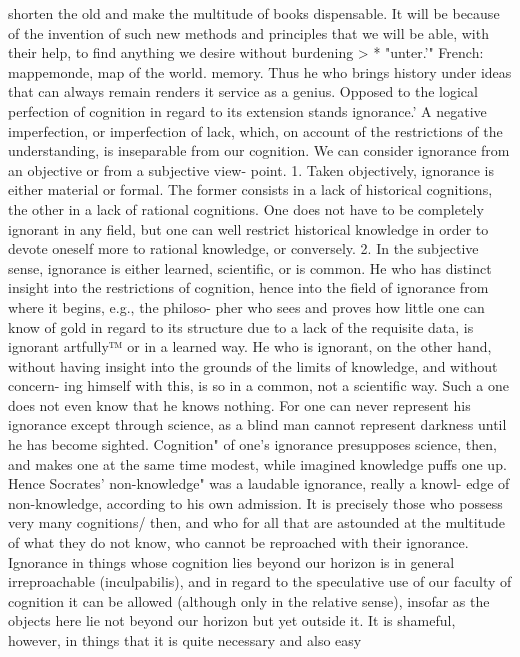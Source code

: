 shorten the old and make the multitude of books dispensable. It will be
because of the invention of such new methods and principles that we will
be able, with their help, to find anything we desire without burdening
>
*
"unter.'"
French: mappemonde, map of the world.
memory. Thus he who brings history under ideas that can always remain
renders it service as a genius.
Opposed to the logical perfection of cognition in regard to its extension
stands ignorance.' A negative imperfection, or imperfection of lack, which,
on account of the restrictions of the understanding, is inseparable from
our cognition.
We can consider ignorance from an objective or from a subjective view-
point.
1. Taken objectively, ignorance is either material or formal. The former
consists in a lack of historical cognitions, the other in a lack of rational
cognitions. One does not have to be completely ignorant in any field, but
one can well restrict historical knowledge in order to devote oneself more
to rational knowledge, or conversely.
2. In the subjective sense, ignorance is either learned, scientific, or is
common. He who has distinct insight into the restrictions of cognition,
hence into the field of ignorance from where it begins, e.g., the philoso-
pher who sees and proves how little one can know of gold in regard to its
structure due to a lack of the requisite data, is ignorant artfully™ or in a
learned way. He who is ignorant, on the other hand, without having
insight into the grounds of the limits of knowledge, and without concern-
ing himself with this, is so in a common, not a scientific way. Such a one
does not even know that he knows nothing. For one can never represent
his ignorance except through science, as a blind man cannot represent
darkness until he has become sighted.
Cognition" of one's ignorance presupposes science, then, and makes
one at the same time modest, while imagined knowledge puffs one up.
Hence Socrates' non-knowledge" was a laudable ignorance, really a knowl-
edge of non-knowledge, according to his own admission. It is precisely
those who possess very many cognitions/ then, and who for all that are
astounded at the multitude of what they do not know, who cannot be
reproached with their ignorance.
Ignorance in things whose cognition lies beyond our horizon is in
general irreproachable (inculpabilis), and in regard to the speculative use of
our faculty of cognition it can be allowed (although only in the relative
sense), insofar as the objects here lie not beyond our horizon but yet outside
it. It is shameful, however, in things that it is quite necessary and also easy

